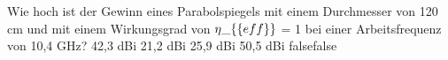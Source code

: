     {Wie hoch ist der Gewinn eines Parabolspiegels mit einem Durchmesser von 120 cm und mit einem Wirkungsgrad von $\eta\_\{\textrm\{eff\}\}$ = 1 bei einer Arbeitsfrequenz von 10,4 GHz?}
    {42,3 dBi}
    {21,2 dBi}
    {25,9 dBi}
    {50,5 dBi}
    {false}{false}